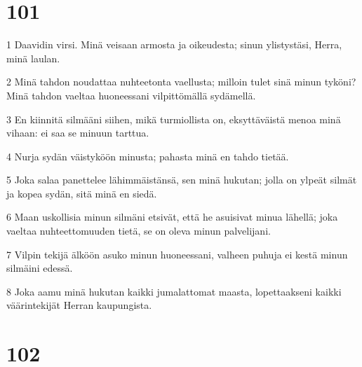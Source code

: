 \chapter{101}

\par 1 Daavidin virsi. Minä veisaan armosta ja oikeudesta; sinun ylistystäsi, Herra, minä laulan.
\par 2 Minä tahdon noudattaa nuhteetonta vaellusta; milloin tulet sinä minun tyköni? Minä tahdon vaeltaa huoneessani vilpittömällä sydämellä.
\par 3 En kiinnitä silmääni siihen, mikä turmiollista on, eksyttäväistä menoa minä vihaan: ei saa se minuun tarttua.
\par 4 Nurja sydän väistyköön minusta; pahasta minä en tahdo tietää.
\par 5 Joka salaa panettelee lähimmäistänsä, sen minä hukutan; jolla on ylpeät silmät ja kopea sydän, sitä minä en siedä.
\par 6 Maan uskollisia minun silmäni etsivät, että he asuisivat minua lähellä; joka vaeltaa nuhteettomuuden tietä, se on oleva minun palvelijani.
\par 7 Vilpin tekijä älköön asuko minun huoneessani, valheen puhuja ei kestä minun silmäini edessä.
\par 8 Joka aamu minä hukutan kaikki jumalattomat maasta, lopettaakseni kaikki väärintekijät Herran kaupungista.

\chapter{102}

